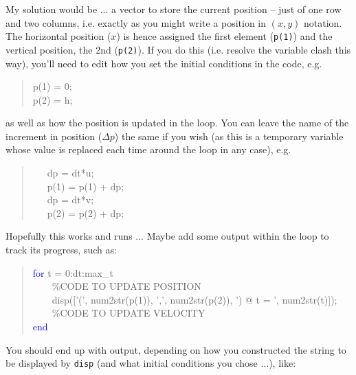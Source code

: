 \documentclass{tufte-book} %
\newenvironment{docspec}{\begin{quotation}\ttfamily\parskip0pt\parindent0pt\ignorespaces}{\end{quotation}}
\newenvironment{docspecmargin}{\begin{quotation}\ttfamily\footnotesize\parskip0pt\parindent0pt\ignorespaces}{\end{quotation}}
\begin{document}
My solution would be ... a vector to store the current position -- just of one row and two columns, i.e. exactly as you might write a position in \((x,y)\) notation. The horizontal position (\(x\)) is hence assigned the first element (\texttt{p(1)}) and the vertical position, the 2nd (\texttt{p(2)}). If you do this (i.e. resolve the variable clash this way), you'll need to edit how you set the initial conditions in the code, e.g.
\begin{docspec}
p(1) = 0;
\\p(2) = h;
\end{docspec}
as well as how the position is updated in the loop. You can leave the name of the increment in position (\(\Delta p\)) the same if you wish (as this is a temporary variable whose value is replaced each time around the loop in any case), e.g.
\begin{docspec}
\ \ \ dp = dt*u;\\
\ \ \ p(1) = p(1) + dp;\\
\ \ \ dp = dt*v;\\
\ \ \ p(2) = p(2) + dp;
\end{docspec}

Hopefully this works and runs ... Maybe add some output within the loop to track its progress, such as:
\begin{docspecmargin}
\textcolor{blue}{for} t = 0:dt:max\_t
\\ \ \ \ \ \textcolor[rgb]{0,0.501961,0}{\%CODE TO UPDATE POSITION}
\\ \ \ \ \ disp([\textcolor[rgb]{1,0,1}{'('}, num2str(p(1)), \textcolor[rgb]{1,0,1}{','}, num2str(p(2)), \textcolor[rgb]{1,0,1}{') @ t = '}, num2str(t)]);
\\ \ \ \ \ \textcolor[rgb]{0,0.501961,0}{\%CODE TO UPDATE VELOCITY}
\\\textcolor{blue}{end}
\end{docspecmargin}

You should end up with output, depending on how you constructed the string to be displayed by \texttt{disp} (and what initial conditions you chose ...), like:
\end{document}
